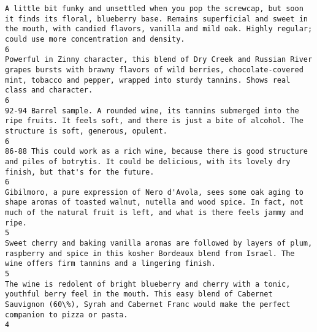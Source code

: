 \documentclass[11pt]{article}
\begin{document}
    \begin{Verbatim}[commandchars=\\\{\}]
A little bit funky and unsettled when you pop the screwcap, but soon it finds its floral, blueberry base. Remains superficial and sweet in the mouth, with candied flavors, vanilla and mild oak. Highly regular; could use more concentration and density.                                                                                                                                                    6
Powerful in Zinny character, this blend of Dry Creek and Russian River grapes bursts with brawny flavors of wild berries, chocolate-covered mint, tobacco and pepper, wrapped into sturdy tannins. Shows real class and character.                                                                                                                                                                             6
92-94 Barrel sample. A rounded wine, its tannins submerged into the ripe fruits. It feels soft, and there is just a bite of alcohol. The structure is soft, generous, opulent.                                                                                                                                                                                                                                 6
86-88 This could work as a rich wine, because there is good structure and piles of botrytis. It could be delicious, with its lovely dry finish, but that's for the future.                                                                                                                                                                                                                                     6
Gibilmoro, a pure expression of Nero d'Avola, sees some oak aging to shape aromas of toasted walnut, nutella and wood spice. In fact, not much of the natural fruit is left, and what is there feels jammy and ripe.                                                                                                                                                                                           5
Sweet cherry and baking vanilla aromas are followed by layers of plum, raspberry and spice in this kosher Bordeaux blend from Israel. The wine offers firm tannins and a lingering finish.                                                                                                                                                                                                                     5
The wine is redolent of bright blueberry and cherry with a tonic, youthful berry feel in the mouth. This easy blend of Cabernet Sauvignon (60\%), Syrah and Cabernet Franc would make the perfect companion to pizza or pasta.                                                                                                                                                                                  4

\end{Verbatim}
\end{document}
